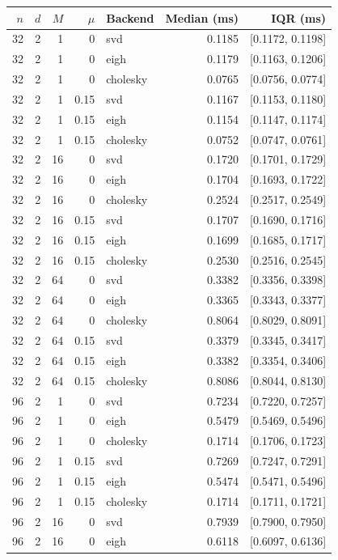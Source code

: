\begin{tabular}{rrrrlrr}
\hline
$n$ & $d$ & $M$ & $\mu$ & Backend & Median (ms) & IQR (ms) \\
\hline
32 & 2 & 1 & 0 & svd & 0.1185 & [0.1172, 0.1198] \\
32 & 2 & 1 & 0 & eigh & 0.1179 & [0.1163, 0.1206] \\
32 & 2 & 1 & 0 & cholesky & 0.0765 & [0.0756, 0.0774] \\
32 & 2 & 1 & 0.15 & svd & 0.1167 & [0.1153, 0.1180] \\
32 & 2 & 1 & 0.15 & eigh & 0.1154 & [0.1147, 0.1174] \\
32 & 2 & 1 & 0.15 & cholesky & 0.0752 & [0.0747, 0.0761] \\
32 & 2 & 16 & 0 & svd & 0.1720 & [0.1701, 0.1729] \\
32 & 2 & 16 & 0 & eigh & 0.1704 & [0.1693, 0.1722] \\
32 & 2 & 16 & 0 & cholesky & 0.2524 & [0.2517, 0.2549] \\
32 & 2 & 16 & 0.15 & svd & 0.1707 & [0.1690, 0.1716] \\
32 & 2 & 16 & 0.15 & eigh & 0.1699 & [0.1685, 0.1717] \\
32 & 2 & 16 & 0.15 & cholesky & 0.2530 & [0.2516, 0.2545] \\
32 & 2 & 64 & 0 & svd & 0.3382 & [0.3356, 0.3398] \\
32 & 2 & 64 & 0 & eigh & 0.3365 & [0.3343, 0.3377] \\
32 & 2 & 64 & 0 & cholesky & 0.8064 & [0.8029, 0.8091] \\
32 & 2 & 64 & 0.15 & svd & 0.3379 & [0.3345, 0.3417] \\
32 & 2 & 64 & 0.15 & eigh & 0.3382 & [0.3354, 0.3406] \\
32 & 2 & 64 & 0.15 & cholesky & 0.8086 & [0.8044, 0.8130] \\
96 & 2 & 1 & 0 & svd & 0.7234 & [0.7220, 0.7257] \\
96 & 2 & 1 & 0 & eigh & 0.5479 & [0.5469, 0.5496] \\
96 & 2 & 1 & 0 & cholesky & 0.1714 & [0.1706, 0.1723] \\
96 & 2 & 1 & 0.15 & svd & 0.7269 & [0.7247, 0.7291] \\
96 & 2 & 1 & 0.15 & eigh & 0.5474 & [0.5471, 0.5496] \\
96 & 2 & 1 & 0.15 & cholesky & 0.1714 & [0.1711, 0.1721] \\
96 & 2 & 16 & 0 & svd & 0.7939 & [0.7900, 0.7950] \\
96 & 2 & 16 & 0 & eigh & 0.6118 & [0.6097, 0.6136] \\

\end{tabular}
